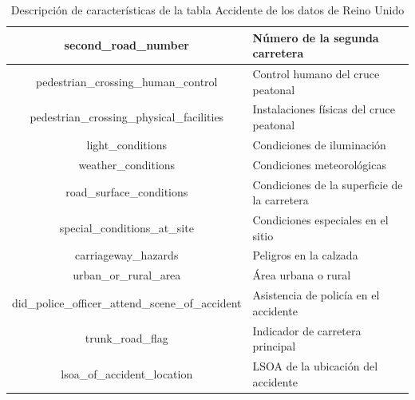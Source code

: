 \begin{table}[H]
\begin{center}
\begin{tabular}{|c|l|}
			second\_road\_number & Número de la segunda carretera \\ \hline
			pedestrian\_crossing\_human\_control & Control humano del cruce peatonal \\ \hline
			pedestrian\_crossing\_physical\_facilities & Instalaciones físicas del cruce peatonal \\ \hline
			light\_conditions & Condiciones de iluminación \\ \hline
			weather\_conditions & Condiciones meteorológicas \\ \hline
			road\_surface\_conditions & Condiciones de la superficie de la carretera \\ \hline
			special\_conditions\_at\_site & Condiciones especiales en el sitio \\ \hline
			carriageway\_hazards & Peligros en la calzada \\ \hline
			urban\_or\_rural\_area & Área urbana o rural \\ \hline
			did\_police\_officer\_attend\_scene\_of\_accident & Asistencia de policía en el accidente \\ \hline
			trunk\_road\_flag & Indicador de carretera principal \\ \hline
			lsoa\_of\_accident\_location & LSOA de la ubicación del accidente \\ \hline
		\end{tabular}
	\end{center}
	\caption{Descripción de características de la tabla Accidente de los datos de Reino Unido}
	\label{UK_ACCIDENT_TABLE}
\end{table} 

